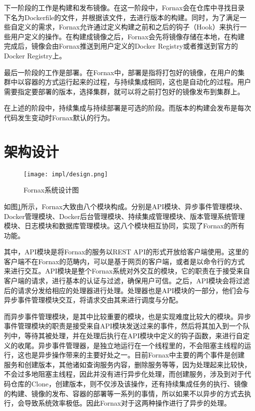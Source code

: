 下一阶段的工作是构建和发布镜像。在这一阶段中，Fornax会在仓库中寻找目录下名为Dockerfile的文件，并根据该文件，去进行版本的构建。同时，为了满足一些自定义的需求，Fornax允许通过定义构建之前和之后的钩子（Hook）来执行一些用户定义的操作。在构建成镜像之后，Fornax会先将镜像存储在本地，在构建完成后，镜像会由Fornax推送到用户定义的Docker Registry或者推送到官方的Docker Registry上。

最后一阶段的工作是部署。在Fornax中，部署是指将打包好的镜像，在用户的集群中以容器的方式运行起来的过程，与持续集成相同，这也是自动化的过程。用户需要指定要部署的版本，选择集群，就可以将之前打包好的镜像发布到集群上。

在上述的阶段中，持续集成与持续部署是可选的阶段。而版本的构建会发布是每次代码发生变动时Fornax默认的行为。

\section{架构设计}

\begin{figure}[!htp]
  \centering
  \texttt{[image: impl/design.png]}
  \caption{Fornax系统设计图}
  \label{fig:design}
\end{figure}

如图\ref{fig:design}所示，Fornax大致由八个模块构成。分别是API模块、异步事件管理模块、Docker管理模块、Docker后台管理模块、持续集成管理模块、版本管理系统管理模块、日志模块和数据库管理模块。这八个模块相互协同，实现了Fornax的所有功能。

其中，API模块是将Fornax的服务以REST API的形式开放给客户端使用。这里的客户端不在Fornax的范畴内，可以是基于网页的客户端，或者是以命令行的方式来进行交互。API模块是整个Fornax系统对外交互的模块，它的职责在于接受来自客户端的请求，进行基本的认证与过滤，确保用户可信。之后，API模块会将过滤后的请求分发给相应的处理器进行处理。处理器也是API模块的一部分，他们会与异步事件管理模块交互，将请求交由其来进行调度与分配。

而异步事件管理模块，是其中比较重要的模块，也是实现难度比较大的模块。异步事件管理模块的职责是接受来自API模块发送过来的事件，然后将其加入到一个队列中，等待其被处理，并在处理后执行在API模块中定义的钩子函数，来进行自定义的收尾。异步事件管理器，是独立地运行在一个线程里的，不会阻塞主线程的运行，这也是异步操作带来的主要好处之一。目前Fornax中主要的两个事件是创建服务和创建版本，其他诸如查询服务内容，删除服务等等，因为处理起来比较快，不会过多地阻塞主线程，因此并没有进行异步化处理，而创建服务，涉及到对于代码仓库的Clone，创建版本，则不仅涉及该操作，还有持续集成任务的执行、镜像的构建、镜像的发布、容器的部署等一系列的事情，所以如果不以异步的方式去执行，会导致系统效率极低。因此Fornax对于这两种操作进行了异步的处理。

